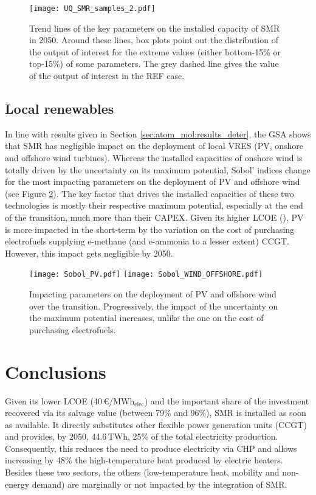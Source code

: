 \begin{figure}[htbp!]
\centering
\texttt{[image: UQ\_SMR\_samples\_2.pdf]}
\caption{Trend lines of the key parameters on the installed capacity of \gls{SMR} in 2050. Around these lines, box plots point out the distribution of the output of interest for the extreme values (either bottom-15\% or top-15\%) of some parameters. The grey dashed line gives the value of the output of interest in the REF case. }
\label{fig:results_uq_samples_SMR}
\end{figure}

\newpage
\subsection{Local renewables}
\label{subsec:atom_mol:results_uq_VRES}
In line with results given in Section \ref{sec:atom_mol:results_deter}, the \gls{GSA} shows that \gls{SMR} has negligible impact on the deployment of local \gls{VRES} (\ie \gls{PV}, onshore and offshore wind turbines). Whereas the installed capacities of onshore wind is totally driven by the uncertainty on its maximum potential, Sobol' indices change for the most impacting parameters on the deployment of \gls{PV} and offshore wind (see Figure \ref{fig:results_uq_pdf_local_ren}). The key factor that drives the installed capacities of these two technologies is mostly their respective maximum potential, especially at the end of the transition, much more than their CAPEX. Given its higher \gls{LCOE} (), \gls{PV} is more impacted in the short-term by the variation on the cost of purchasing electrofuels supplying e-methane (and e-ammonia to a lesser extent) \gls{CCGT}. However, this impact gets negligible by 2050.

\begin{figure}[htbp!]
\centering
\texttt{[image: Sobol\_PV.pdf]}
\texttt{[image: Sobol\_WIND\_OFFSHORE.pdf]}
\caption{Impacting parameters on the deployment of \gls{PV} and offshore wind over the transition. Progressively, the impact of the uncertainty on the maximum potential increases, unlike the one on the cost of purchasing electrofuels.}
\label{fig:results_uq_pdf_local_ren}
\end{figure}


\section{Conclusions}
\label{sec:atom_mol:conclusions}
Given its lower \gls{LCOE} (40\,€/MWh$_{\text{elec}}$) and the important share of the investment recovered via its salvage value (between 79\% and 96\%), \gls{SMR} is installed as soon as available. It directly substitutes other flexible power generation units (\ie CCGT) and provides, by 2050, 44.6\,TWh, 25\% of the total electricity production. Consequently, this reduces the need to produce electricity via \gls{CHP} and allows increasing by 48\% the high-temperature heat produced by electric heaters. Besides these two sectors, the others (\ie low-temperature heat, mobility and non-energy demand) are marginally or not impacted by the integration of \gls{SMR}.

